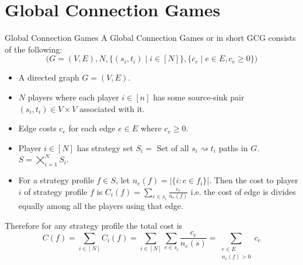 \section{Global Connection Games}
\begin{Definition}{Global Connection Games}{}
	A Global Connection Games or in short GCG consists of the following:$$\Big(G=(V,E),N,\{(s_i,t_i)\mid i\in[N]\}, \{c_e \mid e\in E,c_e\geq 0\}\Big)$$
	\begin{itemize}[itemsep=-1mm]
		\item A directed graph $G=(V,E)$.
		\item $N$ players where  each player $i\in[n]$ has some source-sink pair $(s_i,t_i)\in V\times V$ associated with it.
		\item Edge costs $c_e$ for each edge $e\in E$ where $c_e\geq 0$.
		\item Player $i\in[N]$ has strategy set $S_i=$ Set of all $s_i\rightsquigarrow t_i$ paths in $G$. $S=\bigtimes\limits_{i=1}^N S_i$.
		\item For a strategy profile $f\in S$, let $n_e(f)=|\{i\colon e\in f_i\}|$. Then the cost to player $i$ of strategy profile $f$ is $C_i(f)=\sum\limits_{e\in s_i}\frac{c_e}{n_e(f)}$ i.e. the cost of edge is divides equally among all the players using that edge.
	\end{itemize}
\end{Definition}

Therefore for any strategy profile the total cost is $$C(f)=\sum\limits_{i\in[N]}C_i(f)=\sum\limits_{i\in[N]}\sum\limits_{e\in s_i}\frac{c_e}{n_e(s)}=\sum\limits_{\substack{e\in E\\ n_e(f)>0}}c_e$$


